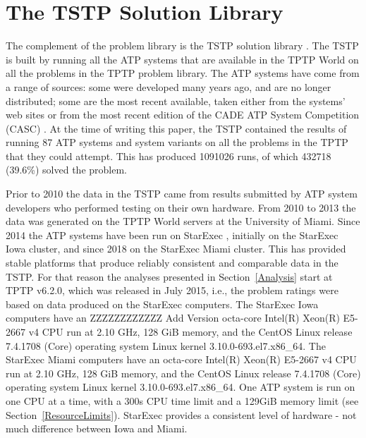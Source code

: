 \documentclass[runningheads]{llncs}
\begin{document}
\section{The TSTP Solution Library}
\label{TSTP}

The complement of the problem library is the TSTP solution library \cite{Sut07-CSR,Sut10}.
The TSTP is built by running all the ATP systems that are available in the TPTP World on
all the problems in the TPTP problem library.
The ATP systems have come from a range of sources:
some were developed many years ago, and are no longer distributed;
some are the most recent available, taken either from the systems’ web sites or from the most 
recent edition of the CADE ATP System Competition (CASC) \cite{Sut16}.
At the time of writing this paper, the TSTP contained the results of running 87 ATP systems and 
system variants on all the problems in the TPTP that they could attempt.
This has produced 1091026 runs, of which 432718 (39.6\%) solved the problem.

Prior to 2010 the data in the TSTP came from results submitted by ATP system developers who
performed testing on their own hardware.
From 2010 to 2013 the data was generated on the TPTP World servers at the University of Miami.
Since 2014 the ATP systems have been run on StarExec \cite{SST14}, initially on the StarExec
Iowa cluster, and since 2018 on the StarExec Miami cluster.
This has provided stable platforms that produce reliably consistent and comparable data in
the TSTP.
For that reason the analyses presented in Section~\ref{Analysis} start at TPTP v6.2.0, which
was released in July 2015, i.e., the problem ratings were based on data produced on the StarExec
computers.
The StarExec Iowa computers have an ZZZZZZZZZZZZ Add Version
octa-core Intel(R) Xeon(R) E5-2667 v4 CPU run at 2.10 GHz,
128 GiB memory,
and the CentOS Linux release 7.4.1708 (Core) operating system
Linux kernel 3.10.0-693.el7.x86\_64.
The StarExec Miami computers have an
octa-core Intel(R) Xeon(R) E5-2667 v4 CPU run at 2.10 GHz,
128 GiB memory,
and the CentOS Linux release 7.4.1708 (Core) operating system
Linux kernel 3.10.0-693.el7.x86\_64.
One ATP system is run on one CPU at a time, with a 300s CPU time limit and a 129GiB memory
limit (see Section~\ref{ResourceLimits}).
StarExec provides a consistent level of hardware - not much difference between Iowa and Miami.
\end{document}
